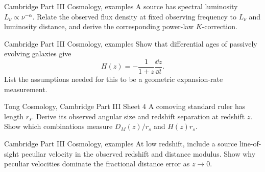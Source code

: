 \begin{exercise}{Cambridge Part III Cosmology, examples}
A source has spectral luminosity \(L_\nu\propto\nu^{-\alpha}\).  Relate the
observed flux density at fixed observing frequency to \(L_\nu\) and
luminosity distance, and derive the corresponding power-law \(K\)-correction.
\end{exercise}

\begin{exercise}{Cambridge Part III Cosmology, examples}
Show that differential ages of passively evolving galaxies give
\[
H(z)=-\frac{1}{1+z}\frac{\dd z}{\dd t}.
\]
List the assumptions needed for this to be a geometric expansion-rate
measurement.
\end{exercise}

\begin{exercise}{Tong Cosmology, Cambridge Part III Sheet 4}
A comoving standard ruler has length \(r_s\).  Derive its observed angular
size and redshift separation at redshift \(z\).  Show which combinations
measure \(D_M(z)/r_s\) and \(H(z)r_s\).
\end{exercise}

\begin{exercise}{Cambridge Part III Cosmology, examples}
At low redshift, include a source line-of-sight peculiar velocity in the
observed redshift and distance modulus.  Show why peculiar velocities dominate
the fractional distance error as \(z\to0\).
\end{exercise}
